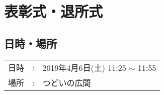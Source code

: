 %

\section{表彰式・退所式}

\subsection{日時・場所}
\begin{tabular}{p{}rp{}}
  日時 & : & 2019年4月6日(土) 11:25 $\sim$ 11:55\\
  場所 & : & つどいの広間
\end{tabular}

